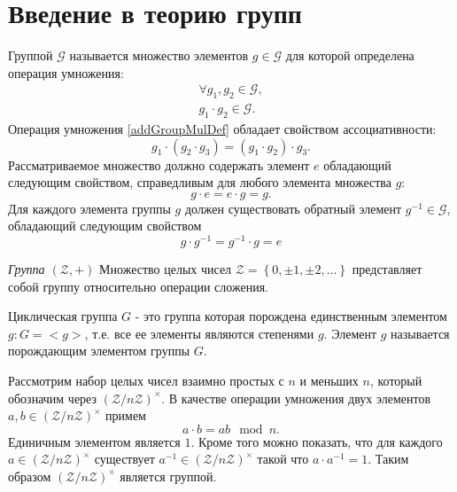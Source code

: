 \section{Введение в теорию групп}
\begin{definition}
Группой $\mathcal{G}$ называется множество элементов $g \in
\mathcal{G}$ для которой определена 
операция умножения:
\begin{eqnarray}
\forall g_1,g_2 \in \mathcal{G},
\nonumber \\
g_1 \cdot g_2 \in \mathcal{G}.
\label{addGroupMulDef}
\end{eqnarray}
Операция умножения \autoref{addGroupMulDef} обладает свойством
ассоциативности:
\begin{equation}
g_1 \cdot \left( g_2 \cdot g_3 \right ) = 
\left( g_1 \cdot  g_2 \right ) \cdot g_3.
\nonumber
\end{equation}
Рассматриваемое множество должно содержать элемент $e$ обладающий
следующим свойством, справедливым для любого элемента множества $g$:
\begin{equation}
g \cdot e = e \cdot g = g.
\nonumber
\end{equation}
Для каждого элемента группы $g$ должен существовать обратный
элемент $g^{-1} \in \mathcal{G}$, обладающий следующим свойством
\begin{equation}
g \cdot g^{-1} = g^{-1} \cdot g = e
\nonumber
\end{equation}
\label{defAddGroup}
\end{definition}

\begin{example}
\emph{Группа $\left(\mathcal{Z}, +\right)$}
Множество целых чисел $\mathcal{Z} = \left\{0, \pm1, \pm2,
\dots\right\}$ представляет собой группу относительно операции сложения.
\nonumber
\end{example}

\begin{definition}
Циклическая группа $G$ - это группа которая порождена единственным
элементом $g: G = <g>$, т.е. все ее элементы являются степенями $g$.
Элемент $g$ называется порождающим элементом группы $G$.
\label{def:add:algebra:cyclic_group}
\end{definition}

\begin{definition}
Рассмотрим набор целых чисел взаимно простых с $n$ и меньших $n$,
который обозначим через $\left(\mathcal{Z}/n\mathcal{Z}\right)^\times$. В
качестве операции умножения двух элементов $a,b \in
\left(\mathcal{Z}/n\mathcal{Z}\right)^\times$ примем
\[
a \cdot b = ab \mod n.
\]
Единичным элементом является $1$. Кроме того можно показать, что для
каждого $a \in \left(\mathcal{Z}/n\mathcal{Z}\right)^\times$
существует $a^{-1} \in \left(\mathcal{Z}/n\mathcal{Z}\right)^\times$
такой что $a \cdot a^{-1} = 1$. Таким образом
$\left(\mathcal{Z}/n\mathcal{Z}\right)^\times$ является группой.
\label{def:add:algebra:mult_group}
\end{definition}

